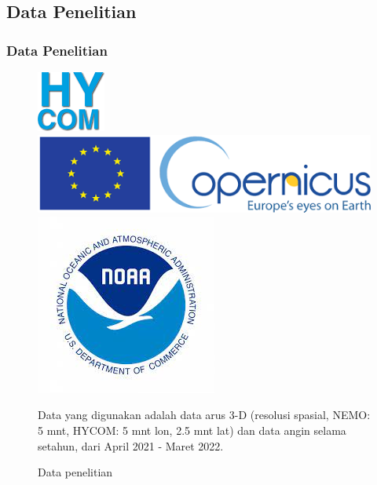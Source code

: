 \documentclass{beamer}
\begin{document}
\subsection{Data Penelitian}
\begin{frame}
	\frametitle{Data Penelitian}
	\begin{figure}[H]
		\centering
		\includegraphics[width=.24\textwidth]{logo_hycom.png} \;\;
		\includegraphics[width=.5\textwidth]{logo_cmmes.png}
		\\[\smallskipamount]
		\includegraphics[width=.24\textwidth]{logo_ncep.jpeg}
		\caption{Data penelitian}
		\label{fig:data}
		\tiny
		Data yang digunakan adalah data arus 3-D (resolusi spasial, NEMO: 5 mnt, HYCOM: 5 mnt lon, 2.5 mnt lat) dan data angin selama setahun, dari April 2021 - Maret 2022. 
	\end{figure}
\end{frame}
\end{document}
